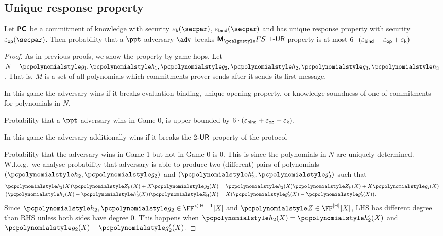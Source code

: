 \subsection{Unique response property}
\begin{lemma}\label{lem:marlinprot_ur}
  Let $\bm{\mathsf{PC}}$ be a commitment of knowledge with security $\epsk(\secpar)$,
  $\epsbind(\secpar)$ and has unique response property with security
  $\epsop(\secpar)$. Then probability that a $\ppt$ adversary $\adv$ breaks
  $\marlinprotfs$ ${1\text{-}\mathsf{UR}}$ property is at most
  $6 \cdot (\varepsilon_{\mathsf{bind}} + \varepsilon_{\mathsf{op}} + \varepsilon_{\mathsf{k}})$ 
\end{lemma}
\begin{proof}
  As in previous proofs, we show the property by game hops. Let
  $N = \p{g_1}, \p{h_1}, \p{g_2}, \p{h_2}, \p{g_3}, \p{h_3}$. That is, $M$ is a
  set of all polynomials which commitments prover sends after it sends its first message.

   In this game the adversary wins if it breaks evaluation
  binding, unique opening property, or knowledge soundness of one of commitments
  for polynomials in $N$.

  Probability that a $\ppt$ adversary wins in Game 0, is upper bounded by $6
  \cdot (\varepsilon_{\mathsf{bind}} + \varepsilon_{\mathsf{op}} + \varepsilon_{\mathsf{k}})$.

   In this game the adversary additionally wins if it breaks the
  ${2\text{-}\mathsf{UR}}$ property of the protocol

   Probability that the adversary wins in
  Game 1 but not in Game 0 is $0$. This is since the polynomials in $N$ are
  uniquely determined. W.l.o.g.~we analyse probability that adversary is able to
  produce two (different) pairs of polynomials $(\p{h_2}, \p{g_2})$ and $(\p{h'_2},
  \p{g'_2})$ such that
  \begin{align*}
    \p{h_2} (X) \ZERO_{\HHH} (X) + X \p{g_2} (X) & = \p{h_2} (X) \ZERO_{\HHH} (X) +
                                                   X \p{g_2} (X)\\
    (\p{h_2} (X) - \p{h'_2} (X)) \ZERO_{\HHH} (X) & = X (\p{g'_2} (X) - \p{g'_2}
    (X)).
  \end{align*}
  Since $\p{h_2}, \p{g_2} \in \FF^{< |\HHH| - 1} [X]$ and
  $\ZERO \in \FF^{|\HHH|} [X]$, LHS has different degree than RHS unless both
  sides have degree $0$. This happens when $\p{h_2} (X) = \p{h'_2} (X)$ and
  $\p{g_2} (X) - \p{g'_2} (X)$.
\end{proof}

